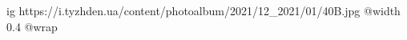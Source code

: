  
 
 
 
 

\ifcmt
  ig https://i.tyzhden.ua/content/photoalbum/2021/12_2021/01/40B.jpg
  @width 0.4
  @wrap 
\fi
